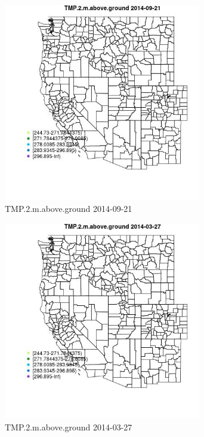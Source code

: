 \begin{figure} 
\centering  
\includegraphics[width=0.77\textwidth]{Code_Outputs/Report_ML_input_PM25_Step4_part_e_de_duplicated_aveswNAs_MapObsTMP2maboveground2014-09-21.jpg} 
\caption{\label{fig:Report_ML_input_PM25_Step4_part_e_de_duplicated_aveswNAsMapObsTMP2maboveground2014-09-21}TMP.2.m.above.ground 2014-09-21} 
\end{figure} 
 

\begin{figure} 
\centering  
\includegraphics[width=0.77\textwidth]{Code_Outputs/Report_ML_input_PM25_Step4_part_e_de_duplicated_aveswNAs_MapObsTMP2maboveground2014-03-27.jpg} 
\caption{\label{fig:Report_ML_input_PM25_Step4_part_e_de_duplicated_aveswNAsMapObsTMP2maboveground2014-03-27}TMP.2.m.above.ground 2014-03-27} 
\end{figure} 
 


